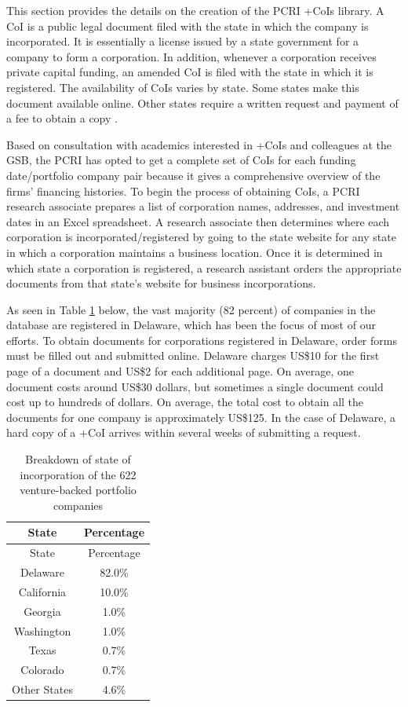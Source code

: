 \documentclass[
]{book}
\begin{document}
This section provides the details on the creation of the PCRI +CoIs\textbar{} library. A CoI is a public legal document filed with the state in which the company is incorporated. It is essentially a license issued by a state government for a company to form a corporation. In addition, whenever a corporation receives private capital funding, an amended CoI is filed with the state in which it is registered. The availability of CoIs varies by state. Some states make this document available online. Other states require a written request and payment of a fee to obtain a copy \citep{masters2020}.

Based on consultation with academics interested in +CoIs\textbar{} and colleagues at the GSB, the PCRI has opted to get a complete set of CoIs for each funding date/portfolio company pair because it gives a comprehensive overview of the firms' financing histories. To begin the process of obtaining CoIs, a PCRI research associate prepares a list of corporation names, addresses, and investment dates in an Excel spreadsheet. A research associate then determines where each corporation is incorporated/registered by going to the state website for any state in which a corporation maintains a business location. Once it is determined in which state a corporation is registered, a research assistant orders the appropriate documents from that state's website for business incorporations.

As seen in Table \ref{tab:pcritable2} below, the vast majority (82 percent) of companies in the database are registered in Delaware, which has been the focus of most of our efforts. To obtain documents for corporations registered in Delaware, order forms must be filled out and submitted online. Delaware charges US\$10 for the first page of a document and US\$2 for each additional page. On average, one document costs around US\$30 dollars, but sometimes a single document could cost up to hundreds of dollars. On average, the total cost to obtain all the documents for one company is approximately US\$125. In the case of Delaware, a hard copy of a +CoI\textbar{} arrives within several weeks of submitting a request.

\begin{longtable}[]{@{}cc@{}}
\caption{\label{tab:pcritable2} Breakdown of state of incorporation of the 622 venture-backed portfolio companies}\tabularnewline
\toprule
State & Percentage\tabularnewline
\midrule
\endfirsthead
\toprule
State & Percentage\tabularnewline
\midrule
\endhead
Delaware & 82.0\%\tabularnewline
California & 10.0\%\tabularnewline
Georgia & 1.0\%\tabularnewline
Washington & 1.0\%\tabularnewline
Texas & 0.7\%\tabularnewline
Colorado & 0.7\%\tabularnewline
Other States & 4.6\%\tabularnewline
\bottomrule
\end{longtable}
\end{document}
